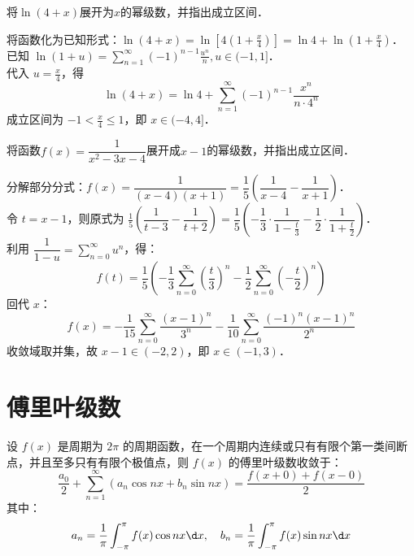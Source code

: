 \documentclass[12pt, a4paper, oneside, UTF8]{ctexbook}
\begin{document}
\begin{example}
    将$\ln (4+x)$展开为$x$的幂级数，并指出成立区间．
\end{example}
\begin{solution}
    将函数化为已知形式：$\ln (4+x) = \ln\left[4(1+\frac{x}{4})\right] = \ln 4 + \ln(1+\frac{x}{4})$．\\
    已知 $\ln(1+u) = \displaystyle\sum_{n=1}^\infty (-1)^{n-1} \frac{u^n}{n}, u \in (-1, 1]$．\\
    代入 $u = \frac{x}{4}$，得 \[ \boxed{\ln(4+x) = \ln 4 + \sum_{n=1}^\infty (-1)^{n-1} \frac{x^n}{n \cdot 4^n}} \]
    成立区间为 $-1 < \frac{x}{4} \le 1$，即 $\boxed{x \in (-4, 4]}$．
\end{solution}

\begin{example}
    将函数$f(x)=\dfrac{1}{x^2-3x-4}$展开成$x-1$的幂级数，并指出成立区间．
\end{example}
\begin{solution}
    分解部分分式：$f(x) = \dfrac{1}{(x-4)(x+1)} = \dfrac{1}{5} \left( \dfrac{1}{x-4} - \dfrac{1}{x+1} \right)$．\\
    令 $t = x-1$，则原式为 $\frac{1}{5} \left( \dfrac{1}{t-3} - \dfrac{1}{t+2} \right) = \dfrac{1}{5} \left( -\dfrac{1}{3}\cdot\dfrac{1}{1-\frac{t}{3}} - \dfrac{1}{2}\cdot\dfrac{1}{1+\frac{t}{2}} \right)$．\\
    利用 $\dfrac{1}{1-u} = \displaystyle\sum_{n=0}^\infty u^n$，得：
    \[ f(t) = \frac{1}{5} \left( -\frac{1}{3}\sum_{n=0}^\infty \left(\frac{t}{3}\right)^n - \frac{1}{2}\sum_{n=0}^\infty \left(-\frac{t}{2}\right)^n \right) \]
    回代 $x$：\[ \boxed{f(x) = -\frac{1}{15} \sum_{n=0}^\infty \frac{(x-1)^n}{3^n} - \frac{1}{10} \sum_{n=0}^\infty \frac{(-1)^n (x-1)^n}{2^n}} \]
    收敛域取并集，故 $x-1 \in (-2, 2)$，即 $\boxed{x \in (-1, 3)}$．
\end{solution}

\section{傅里叶级数}
\begin{theorem}
    设 $f(x)$ 是周期为 $2\pi$ 的周期函数，在一个周期内连续或只有有限个第一类间断点，并且至多只有有限个极值点，则 $f(x)$ 的傅里叶级数收敛于：
    \[ \frac{a_0}{2} + \sum_{n=1}^\infty (a_n \cos nx + b_n \sin nx) = \frac{f(x+0) + f(x-0)}{2} \]
    其中：
    \[ a_n = \frac{1}{\pi} \int_{-\pi}^{\pi} f(x) \cos nx \d x, \quad b_n = \frac{1}{\pi} \int_{-\pi}^{\pi} f(x) \sin nx \d x \]
\end{theorem}
\end{document}
